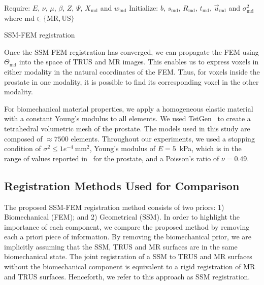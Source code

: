 \documentclass[journal]{IEEEtran}
\begin{document}
\begin{algorithm}[t]\label{alg:SSMFEM1}
 \SetAlgoLined
 Require: $E$, $\nu$, $\mu$, $\beta$, $Z$, $\Psi$, $X_\mathrm{md}$ and $w_\mathrm{md}$\;
 Initialize: $b$, $s_\mathrm{md}$, $R_\mathrm{md}$, $t_\mathrm{md}$, $\vec{u}_\mathrm{md}$ and $\sigma^2_\mathrm{md}$\;
 where $\mathrm{md}\in\{\mathrm{MR},\mathrm{US}\}$\;
 \caption{SSM-FEM registration \label{alg:registration}}
\end{algorithm}

Once the SSM-FEM registration has converged, we can propagate the FEM using $\Theta_\mathrm{md}$ into the space of TRUS and MR images. This enables us to express voxels in either modality in the natural coordinates of the FEM. Thus, for voxels inside the prostate in one modality, it is possible to find its corresponding voxel in the other modality.

For biomechanical material properties, we apply a homogeneous elastic material with a constant Young's modulus to all elements. We used TetGen~\cite{Si06a} to create a tetrahedral volumetric mesh of the prostate.  The models used in this study are composed of $\approx7500$ elements. Throughout our experiments, we used a stopping condition of $\sigma^2\leq1e^{-4}~\mathrm{mm}^2$, Young's modulus of $E=5$~kPa, which is in the range of values reported in~\cite{Kemper04a} for the prostate, and a Poisson's ratio of $\nu=0.49$.
\subsection{Registration Methods Used for Comparison}
The proposed SSM-FEM registration method consists of two priors: 1) Biomechanical (FEM); and 2) Geometrical (SSM). In order to highlight the importance of each component, we compare the proposed method by removing each a priori piece of information. By removing the biomechanical prior, we are implicitly assuming that the SSM, TRUS and MR surfaces are in the same biomechanical state. The joint registration of a SSM to TRUS and MR surfaces without the biomechanical component is equivalent to a rigid registration of MR and TRUS surfaces. Henceforth, we refer to this approach as SSM registration.
\end{document}
